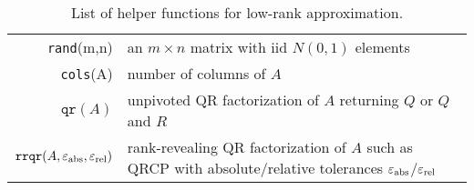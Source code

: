\begin{table}
\centering
\begin{tabular}{r|p{}}
\hline
\texttt{rand}(m,n) & an $m\times n$ matrix with iid $N(0,1)$ elements \\
\texttt{cols}(A) & number of columns of $A$ \\
$\texttt{qr}(A)$ & unpivoted QR factorization of $A$ returning $Q$
    or $Q$ and $R$ \\
$\texttt{rrqr}(A,\varepsilon_{\text{abs}},\varepsilon_{\text{rel}})$ & rank-revealing QR factorization of $A$
    such as QRCP with absolute/relative tolerances $\varepsilon_{\text{abs}}$/$\varepsilon_{\text{rel}}$ \\
\hline
\end{tabular}
\caption[List of helper functions for low-rank approximation]{
List of helper functions for low-rank approximation.}
\label{tab:rand_helper_funcs}
\end{table}
